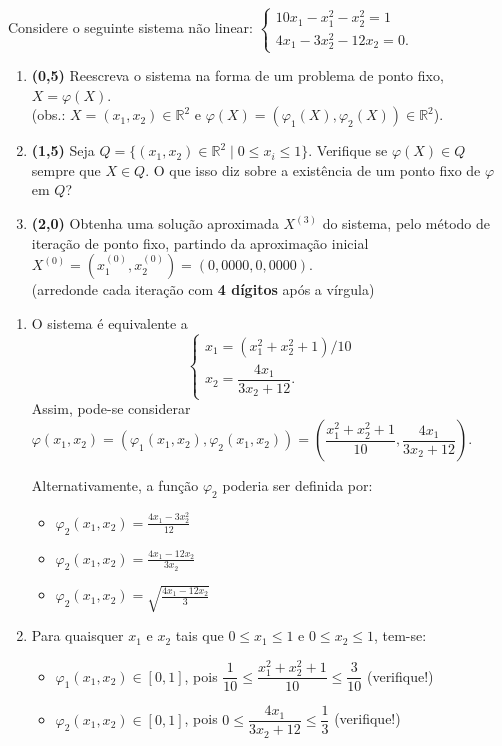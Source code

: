 \documentclass[12pt,a4paper]{article}
\newcommand*\R{\mathbb{R}}
\begin{document}
\begin{ExerciseList}
\Exercise%
Considere o seguinte sistema não linear:
$\begin{cases}
10x_1-x_1^2-x_2^2 = 1\\
4x_1-3x_2^2-12x_2 = 0.
\end{cases}$
\begin{enumerate}
\item \textbf{(0,5)} Reescreva o sistema na forma de um problema de ponto fixo, $X = \varphi(X)$.\\
(obs.: $X = (x_1, x_2) \in \R^2$ e $\varphi(X) = (\varphi_1(X), \varphi_2(X)) \in \R^2$).
\item \textbf{(1,5)} Seja $Q = \{(x_1, x_2) \in \R^2 \mid 0 \leq x_i \leq 1 \}$. Verifique se $\varphi(X) \in Q$ sempre que $X \in Q$. O que isso diz sobre a existência de um ponto fixo de $\varphi$ em $Q$?
\item \textbf{(2,0)} Obtenha uma solução aproximada $X^{(3)}$ do sistema, pelo método de iteração de ponto fixo, partindo da aproximação inicial $X^{(0)}=(x_1^{(0)}, x_2^{(0)}) = (0,0000, 0,0000)$.\\
(arredonde cada iteração com \textbf{4 dígitos} após a vírgula)
\end{enumerate}
\Answer
\begin{enumerate}
\item O sistema é equivalente a
\[
\begin{cases}
x_1 = (x_1^2+x_2^2+1)/10\\
x_2 = \dfrac{4x_1}{3x_2+12}.
\end{cases}
\]
Assim, pode-se considerar $\varphi(x_1, x_2) = \left( \varphi_1(x_1, x_2), \varphi_2(x_1, x_2) \right) = \left( \dfrac{x_1^2+x_2^2+1}{10}, \dfrac{4x_1}{3x_2+12} \right)$.

Alternativamente, a função $\varphi_2$ poderia ser definida por:
\begin{multicols}{3}
\begin{itemize}
\item $\varphi_2(x_1, x_2) = \frac{4x_1-3x_2^2}{12}$
\item $\varphi_2(x_1, x_2) = \frac{4x_1-12x_2}{3x_2}$
\item $\varphi_2(x_1, x_2) = \sqrt{\frac{4x_1-12x_2}{3}}$
\end{itemize}
\end{multicols}
\item Para quaisquer $x_1$ e $x_2$ tais que $0 \leq x_1 \leq 1$ e $0 \leq x_2 \leq 1$, tem-se:
\begin{itemize}
\item $\varphi_1(x_1, x_2) \in [0, 1]$, pois $\dfrac{1}{10} \leq \dfrac{x_1^2+x_2^2+1}{10} \leq \dfrac{3}{10}$ (verifique!)
\item $\varphi_2(x_1, x_2) \in [0, 1]$, pois $0 \leq \dfrac{4x_1}{3x_2+12} \leq \dfrac{1}{3}$ (verifique!)
\end{itemize}


\end{enumerate}
\end{ExerciseList}
\end{document}
